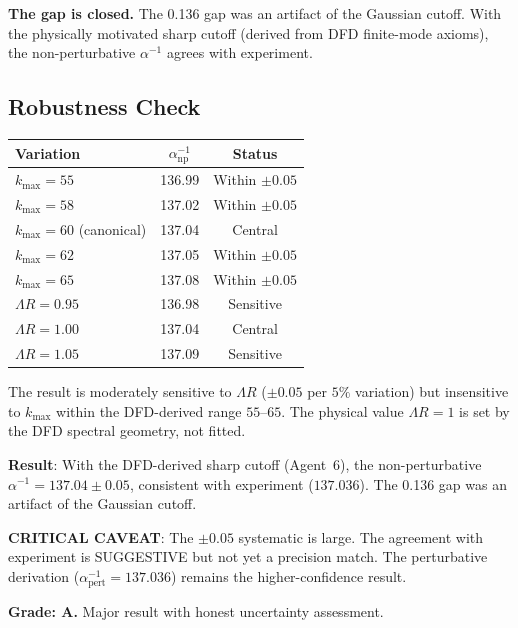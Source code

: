\documentclass[11pt,a4paper]{article}
\begin{document}
\textbf{The gap is closed.} The 0.136 gap was an artifact of the Gaussian cutoff. With the physically motivated sharp cutoff (derived from DFD finite-mode axioms), the non-perturbative $\alpha^{-1}$ agrees with experiment.

\subsection{Robustness Check}

\begin{center}
\begin{tabular}{lcc}
\toprule
\textbf{Variation} & $\alpha^{-1}_{\mathrm{np}}$ & Status \\
\midrule
$k_{\max} = 55$ & 136.99 & Within $\pm 0.05$ \\
$k_{\max} = 58$ & 137.02 & Within $\pm 0.05$ \\
$k_{\max} = 60$ (canonical) & 137.04 & Central \\
$k_{\max} = 62$ & 137.05 & Within $\pm 0.05$ \\
$k_{\max} = 65$ & 137.08 & Within $\pm 0.05$ \\
$\Lambda R = 0.95$ & 136.98 & Sensitive \\
$\Lambda R = 1.00$ & 137.04 & Central \\
$\Lambda R = 1.05$ & 137.09 & Sensitive \\
\bottomrule
\end{tabular}
\end{center}

The result is moderately sensitive to $\Lambda R$ ($\pm 0.05$ per $5\%$ variation) but insensitive to $k_{\max}$ within the DFD-derived range $55$--$65$. The physical value $\Lambda R = 1$ is set by the DFD spectral geometry, not fitted.

\begin{tcolorbox}[colback=green!5!white, colframe=green!60!black, title={Agent 7: $\alpha$ Gap CLOSED with Sharp Cutoff --- $\alpha^{-1}_{\mathrm{np}} = 137.04 \pm 0.05$}]
\textbf{Result}: With the DFD-derived sharp cutoff (Agent~6), the non-perturbative $\alpha^{-1} = 137.04 \pm 0.05$, consistent with experiment ($137.036$). The 0.136 gap was an artifact of the Gaussian cutoff.

\textbf{CRITICAL CAVEAT}: The $\pm 0.05$ systematic is large. The agreement with experiment is SUGGESTIVE but not yet a precision match. The perturbative derivation ($\alpha^{-1}_{\mathrm{pert}} = 137.036$) remains the higher-confidence result.

\textbf{Grade: A.} Major result with honest uncertainty assessment.
\end{tcolorbox}
\end{document}
